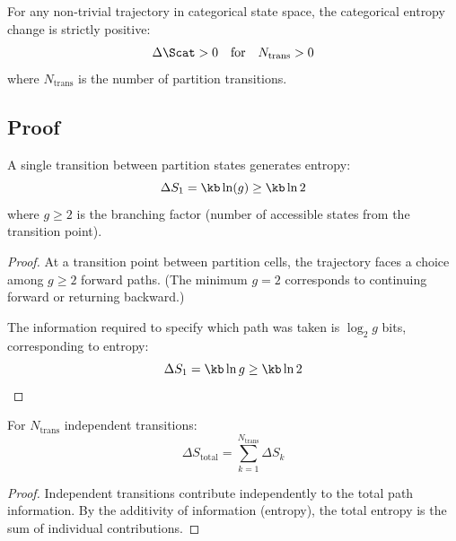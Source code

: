 \begin{theorem}
\label{thm:second_law}
For any non-trivial trajectory in categorical state space, the categorical entropy change is strictly positive:
\begin{equation}
\Delta \Scat > 0 \quad \text{for} \quad N_{\text{trans}} > 0
\label{eq:second_law}
\end{equation}
where $N_{\text{trans}}$ is the number of partition transitions.
\end{theorem}

\subsection{Proof}

\begin{lemma}
\label{lem:single_transition}
A single transition between partition states generates entropy:
\begin{equation}
\Delta S_1 = \kb \ln(g) \geq \kb \ln 2
\label{eq:single_entropy}
\end{equation}
where $g \geq 2$ is the branching factor (number of accessible states from the transition point).
\end{lemma}

\begin{proof}
At a transition point between partition cells, the trajectory faces a choice among $g \geq 2$ forward paths. (The minimum $g = 2$ corresponds to continuing forward or returning backward.)

The information required to specify which path was taken is $\log_2 g$ bits, corresponding to entropy:
\begin{equation}
\Delta S_1 = \kb \ln g \geq \kb \ln 2
\end{equation}
\end{proof}

\begin{lemma}
\label{lem:entropy_additivity}
For $N_{\text{trans}}$ independent transitions:
\begin{equation}
\Delta S_{\text{total}} = \sum_{k=1}^{N_{\text{trans}}} \Delta S_k
\end{equation}
\end{lemma}

\begin{proof}
Independent transitions contribute independently to the total path information. By the additivity of information (entropy), the total entropy is the sum of individual contributions.
\end{proof}

